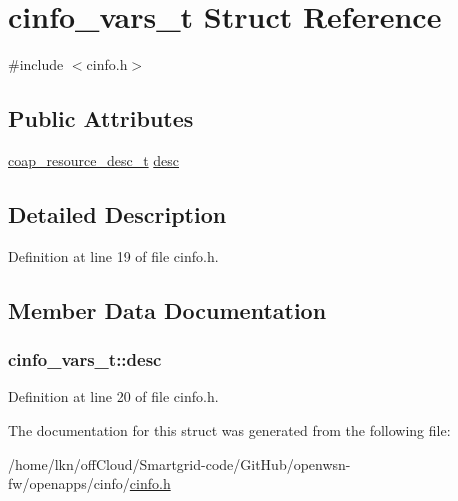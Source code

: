 \hypertarget{structcinfo__vars__t}{}\section{cinfo\+\_\+vars\+\_\+t Struct Reference}
\label{structcinfo__vars__t}


{\ttfamily \#include $<$cinfo.\+h$>$}

\subsection*{Public Attributes}
\begin{DoxyCompactItemize}
\item 
\hyperlink{structcoap__resource__desc__t}{coap\+\_\+resource\+\_\+desc\+\_\+t} \hyperlink{structcinfo__vars__t_a413802f66e42dc2f3b70cbe9a47a2436}{desc}
\end{DoxyCompactItemize}


\subsection{Detailed Description}


Definition at line 19 of file cinfo.\+h.



\subsection{Member Data Documentation}
\subsubsection[{\texorpdfstring{desc}{desc}}]{ cinfo\+\_\+vars\+\_\+t\+::desc}\hypertarget{structcinfo__vars__t_a413802f66e42dc2f3b70cbe9a47a2436}{}\label{structcinfo__vars__t_a413802f66e42dc2f3b70cbe9a47a2436}


Definition at line 20 of file cinfo.\+h.



The documentation for this struct was generated from the following file\+:\begin{DoxyCompactItemize}
\item 
/home/lkn/off\+Cloud/\+Smartgrid-\/code/\+Git\+Hub/openwsn-\/fw/openapps/cinfo/\hyperlink{cinfo_8h}{cinfo.\+h}\end{DoxyCompactItemize}
